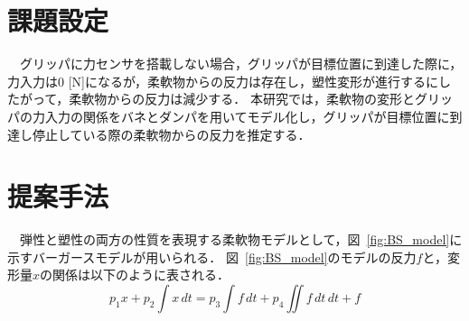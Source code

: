 \documentclass[a4paper]{jarticle}
\begin{document}
\section{課題設定}
　グリッパに力センサを搭載しない場合，グリッパが目標位置に到達した際に，力入力は0 [N]になるが，柔軟物からの反力は存在し，塑性変形が進行するにしたがって，柔軟物からの反力は減少する．
本研究では，柔軟物の変形とグリッパの力入力の関係をバネとダンパを用いてモデル化し，グリッパが目標位置に到達し停止している際の柔軟物からの反力を推定する．

\section{提案手法}
　弾性と塑性の両方の性質を表現する柔軟物モデルとして，図~\ref{fig:BS_model}に示すバーガースモデルが用いられる\cite{ref_MSD}．
図~\ref{fig:BS_model}のモデルの反力$f$と，変形量$x$の関係は以下のように表される．
\begin{equation}
    p_1 {x} + p_2 \int{x}\,dt = p_3\int{f}\,dt +p_4\iint{f}\,dt\,dt  + f
    \label{eq:BSmodel}
\end{equation}
\end{document}
